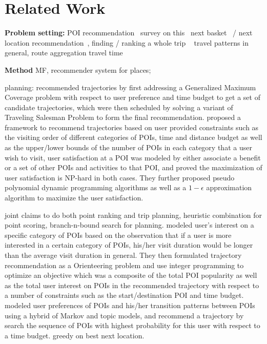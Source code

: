 
\section{Related Work}
\label{relatedwork}

{\bf Problem setting:}
POI recommendation~\cite{shi2011personalized,lian2014geomf,gao2013temporal}  survey on this~\cite{bao2015recommendations}
next basket~\cite{fpmc10} / next location recommendation~\cite{ijcai13}, 
finding / ranking a whole trip ~\cite{lu2012personalized}
travel patterns in general, route aggregation \cite{lu2010photo2trip,zheng2012patterns} travel time~\cite{gao2013temporal}  

{\bf Method}
MF, recommender system for places;

planning:
\cite{tripbuilder15} recommended trajectories by first addressing a Generalized Maximum Coverage problem with respect to user preference and 
time budget to get a set of candidate trajectories, which were then scheduled by solving a variant of Traveling Salesman Problem to form the 
final recommendation.
\cite{wsdm14} proposed a framework to recommend trajectories based on user provided constraints such as the visiting order of different 
categories of POIs, time and distance budget as well as the upper/lower bounds of the number of POIs in each category that a user wish 
to visit, user satisfaction at a POI was modeled by either associate a benefit or a set of other POIs and activities to that POI,
and proved the maximization of user satisfaction is NP-hard in both cases. 
They further proposed pseudo polynomial dynamic programming algorithms as well as 
a $1-\epsilon$ approximation algorithm to maximize the user satisfaction.


joint
\cite{lu2012personalized} claims to do both point ranking and trip planning, heuristic combination for point scoring, branch-n-bound search for planning. 
\cite{ijcai15} modeled user's interest on a specific category of POIs based on the observation that if a user is more interested in a certain category of POIs, his/her visit duration would be longer than the average visit duration in general. They then formulated trajectory recommendation as a Orienteering problem and use integer programming to optimize an objective which was a composite of the total POI popularity as well as the total user interest on POIs in the recommended trajectory 
with respect to a number of constraints such as the start/destination POI and time budget.
\cite{kurashima2010geotag} modeled user preferences of POIs and his/her transition patterns 
between POIs using a hybrid of 
Markov and topic models, and recommend a trajectory by search the sequence of POIs with highest probability for this user  with respect to a time budget.
greedy on best next location. 


